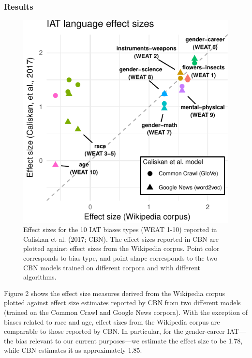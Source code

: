 \documentclass[10pt, letterpaper]{article}
\newenvironment{CodeChunk}{}{}
\begin{document}
\subsubsection{Results}\label{results-1}

\begin{CodeChunk}
\begin{figure}[t]

{\centering \includegraphics{figs/WEAT_plot-1} 

}

\caption[Effect sizes for the 10 IAT biases types (WEAT 1-10) reported in Caliskan et al]{Effect sizes for the 10 IAT biases types (WEAT 1-10) reported in Caliskan et al. (2017; CBN). The effect sizes reported in CBN are plotted against  effect sizes from the Wikipedia corpus.  Point color corresponds to  bias type, and point shape corresponds to the two CBN models trained on different corpora and with different algorithms.}\label{fig:WEAT_plot}
\end{figure}
\end{CodeChunk}

Figure 2 shows the effect size measures derived from the Wikipedia
corpus plotted against effect size estimates reported by CBN from two
different models (trained on the Common Crawl and Google News corpora).
With the exception of biases related to race and age, effect sizes from
the Wikipedia corpus are comparable to those reported by CBN. In
particular, for the gender-career IAT---the bias relevant to our current
purposes---we estimate the effect size to be 1.78, while CBN estimates
it as approximately 1.85.
\end{document}
